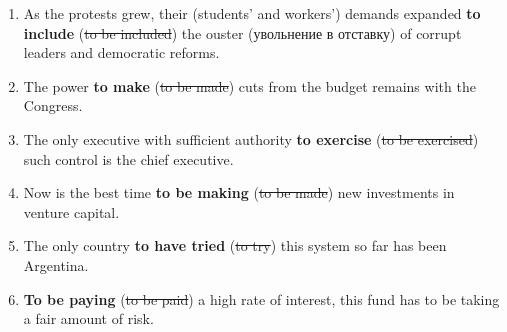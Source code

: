 \documentclass[main.tex]{subfiles}
\begin{document}
\begin{enumerate}[nosep,leftmargin=*]
	\item As the protests grew, their (students' and workers') demands expanded \textbf{to include} (\sout{to be included}) the ouster (увольнение в отставку) of corrupt leaders and democratic reforms.
	\item The power \textbf{to make} (\sout{to be made}) cuts from the budget remains with the Congress.
	\item The only executive with sufficient authority \textbf{to exercise} (\sout{to be exercised}) such control is the chief executive.
	\item Now is the best time \textbf{to be making} (\sout{to be made}) new investments in venture capital.
	\item The only country \textbf{to have tried} (\sout{to try}) this system so far has been Argentina.
	\item \textbf{To be paying} (\sout{to be paid}) a high rate of interest, this fund has to be taking a fair amount of risk.
\end{enumerate}

\newpage
\setcounter{subsection}{7}

\end{document}
